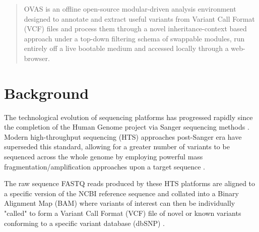 \documentclass[twocolumn]{bmcart}%
\def\app{OVAS}
\newcounter{changeCount}
\newcommand{\changes}[1]{
	\stepcounter{changeCount}
	{\tiny\bf\color{violet}\arabic{changeCount}}
	{\color{red} #1}
}
\begin{document}
\begin{frontmatter}
\begin{fmbox}
\begin{abstractbox}
\begin{abstract}
\app{} is an offline open-source modular-driven analysis environment designed to annotate and extract useful variants from Variant Call Format (VCF) files \changes{and process them through a novel inheritance-context based approach} under a top-down filtering schema of swappable modules, run entirely off a live bootable medium and accessed locally through a web-browser.

\end{abstract}

\begin{keyword}
\end{keyword}


\end{abstractbox}
%
\end{fmbox}%

\end{frontmatter}


\section*{Background}
The technological evolution of sequencing platforms has progressed rapidly since the completion of the Human Genome project via Sanger sequencing methods \cite{lander2001initial,sanger1977dna}. Modern high-throughput sequencing (HTS) approaches post-Sanger era have superseded this standard, allowing for a greater number of variants to be sequenced across the whole genome by employing powerful mass fragmentation/amplification approaches upon a target sequence \cite{lengauer2007bioinformatics,bockenhauer2012genetic}.


The raw sequence FASTQ reads produced by these HTS platforms are aligned to a specific version of the NCBI reference sequence and collated into a Binary Alignment Map (BAM) where variants of interest can then be individually "called" to form a Variant Call Format (VCF) file of novel or known variants conforming to a specific variant database (dbSNP) \cite{li2009sequence,danecek2011variant}.
\end{document}
